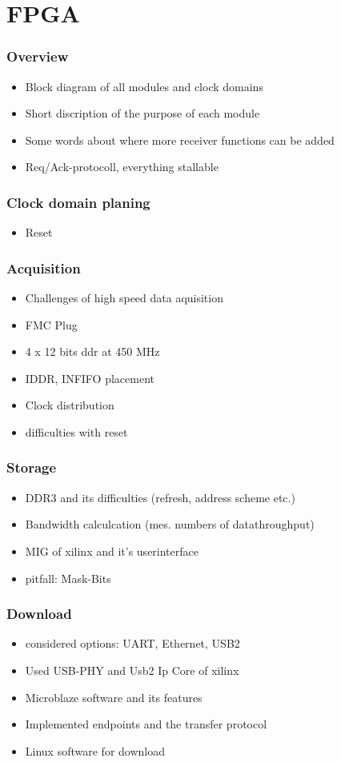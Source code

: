 \chapter{FPGA}
\subsection{Overview}
\begin{itemize}
\item Block diagram of all modules and clock domains
\item Short discription of the purpose of each module
\item Some words about where more receiver functions can be added
\item Req/Ack-protocoll, everything stallable
\end{itemize}

\subsection{Clock domain planing}
\begin{itemize}
\item Reset
\end{itemize}

\subsection{Acquisition}
\begin{itemize}
\item Challenges of high speed data aquisition
\item FMC Plug
\item 4 x 12 bits ddr at 450 MHz
\item IDDR, INFIFO placement
\item Clock distribution
\item difficulties with reset 
\end{itemize}

\subsection{Storage}
\begin{itemize}
\item DDR3 and its difficulties (refresh, address scheme etc.)
\item Bandwidth calculcation (mes. numbers of datathroughput)
\item MIG of xilinx and it's userinterface
\item pitfall: Mask-Bits 
\end{itemize}

\subsection{Download}
\begin{itemize}
\item considered options: UART, Ethernet, USB2
\item Used USB-PHY and Usb2 Ip Core of xilinx
\item Microblaze software and its features
\item Implemented endpoints and the transfer protocol
\item Linux software for download
\end{itemize}
